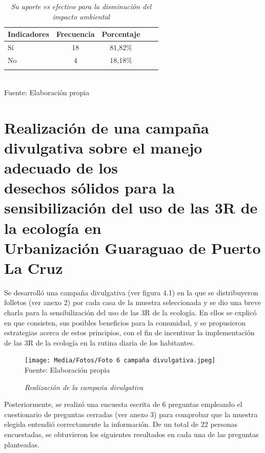 \begin{table}[h!]
    \centering
    \captionsetup{singlelinecheck=false, justification=raggedright, labelsep=newline}
    \caption{\textit{Su aporte es efectivo para la disminución del impacto ambiental}}
    \begin{tabular}{lcccc}
        \toprule
        Indicadores & Frecuencia & Porcentaje\\
        \midrule
        Sí & 18 & 81,82\% \\
        No & 4 & 18,18\%\\
        \bottomrule
        \\
    \end{tabular}
    \\\RaggedRight Fuente: Elaboración propia
    \label{table:cuadro8}
\end{table}

\newpage

{\setlength{\parskip}{0cm}
\section{Realización de una campaña divulgativa sobre el manejo adecuado de los \\[6pt] desechos sólidos para la sensibilización del uso de las 3R de la ecología en \\[6pt] Urbanización Guaraguao de Puerto La Cruz}

Se desarrolló una campaña divulgativa (ver figura 4.1) en la que se distribuyeron folletos (ver anexo 2) por cada casa de la muestra seleccionada y se dio una breve charla para la sensibilización del uso de las 3R de la ecología. En ellos se explicó en que consisten, sus posibles beneficios para la comunidad, y se propusieron estrategias acerca de estos principios, con el fin de incentivar la implementación de las 3R de la ecología en la rutina diaria de los habitantes.}

\begin{figure}[h]
    \centering
    \captionsetup{singlelinecheck=false, justification=raggedright, labelsep=newline}
    \caption{\textit{Realización de la campaña divulgativa}}
    \texttt{[image: Media/Fotos/Foto 6 campaña divulgativa.jpeg]}
    \\\RaggedRight Fuente: Elaboración propia
    \label{fig:figura4-1}
\end{figure}

Posteriormente, se realizó una encuesta escrita de 6 preguntas empleando el cuestionario de preguntas cerradas (ver anexo 3) para comprobar que la muestra elegida entendió correctamente la información. De un total de 22 personas encuestadas, se obtuvieron los siguientes resultados en cada una de las preguntas planteadas.

